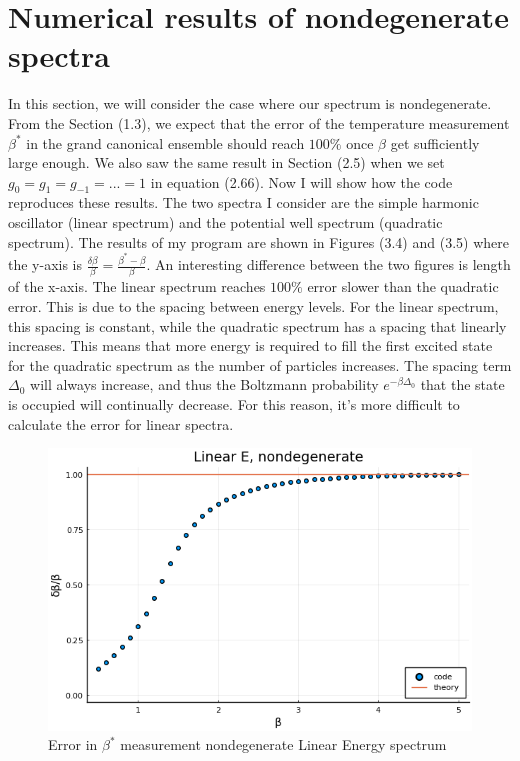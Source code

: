 \section{Numerical results of nondegenerate spectra}
In this section, we will consider the case where our spectrum is nondegenerate. From the Section (1.3), we expect that the error of the temperature measurement $\beta^*$ in the grand canonical ensemble should reach $100\%$ once $\beta$ get sufficiently large enough. We also saw the same result in Section (2.5) when we set $g_0=g_1=g_{-1}=...=1$ in equation (2.66). Now I will show how the code reproduces these results. The two spectra I consider are the simple harmonic oscillator (linear spectrum) and the potential well spectrum (quadratic spectrum). The results of my program are shown in Figures (3.4) and (3.5) where the y-axis is $\frac{\delta\beta}{\beta}=\frac{\beta^*-\beta}{\beta}$. An interesting difference between the two figures is length of the x-axis. The linear spectrum reaches $100\%$ error slower than the quadratic error. This is due to the spacing between energy levels. For the linear spectrum, this spacing is constant, while the quadratic spectrum has a spacing that linearly increases. This means that more energy is required to fill the first excited state for the quadratic spectrum as the number of particles increases. The spacing term $\Delta_0$ will always increase, and thus the Boltzmann probability $e^{-\beta\Delta_0}$ that the state is occupied will continually decrease. For this reason, it's more difficult to calculate the error for linear spectra. 

\begin{figure}[H]
    \centering
    \includegraphics[scale=0.75]{figures/pdf/linEnondeg.png}
    \caption{Error in $\beta^*$ measurement nondegenerate Linear Energy spectrum}
    \label{fig:Error2}
\end{figure}

